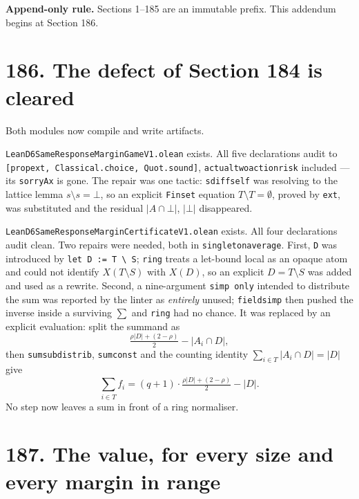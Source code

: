 \documentclass[9pt,twocolumn]{article}
\renewcommand{\_}{\CIGunderscore\allowbreak}
\begin{document}
\sloppy
{}

\textbf{Append-only rule.} Sections 1--185 are an immutable prefix. This addendum begins at Section 186.

\section*{186. The defect of Section 184 is cleared}

Both modules now compile and write artifacts.

\texttt{LeanD6SameResponseMarginGameV1.olean} exists. All five declarations audit to \texttt{[propext, Classical.choice, Quot.sound]}, \texttt{actual\_two\_action\_risk} included --- its \texttt{sorryAx} is gone. The repair was one tactic: \texttt{sdiff\_self} was resolving to the lattice lemma $s\setminus s=\bot$, so an explicit \texttt{Finset} equation $T\setminus T=\emptyset$, proved by \texttt{ext}, was substituted and the residual $|A\cap\bot|$, $|\bot|$ disappeared.

\texttt{LeanD6SameResponseMarginCertificateV1.olean} exists. All four declarations audit clean. Two repairs were needed, both in \texttt{singleton\_average}. First, \texttt{D} was introduced by \texttt{let D := T \textbackslash\ S}; \texttt{ring} treats a let-bound local as an opaque atom and could not identify $X(T\setminus S)$ with $X(D)$, so an explicit $D=T\setminus S$ was added and used as a rewrite. Second, a nine-argument \texttt{simp only} intended to distribute the sum was reported by the linter as \emph{entirely} unused; \texttt{field\_simp} then pushed the inverse inside a surviving $\sum$ and \texttt{ring} had no chance. It was replaced by an explicit evaluation: split the summand as
\[ \tfrac{\rho|D|+(2-\rho)}{2}-|A_i\cap D|, \]
then \texttt{sum\_sub\_distrib}, \texttt{sum\_const} and the counting identity $\sum_{i\in T}|A_i\cap D|=|D|$ give
\[ \sum_{i\in T}f_i=(q+1)\cdot\tfrac{\rho|D|+(2-\rho)}{2}-|D| . \]
No step now leaves a sum in front of a ring normaliser.

\section*{187. The value, for every size and every margin in range}
\end{document}

